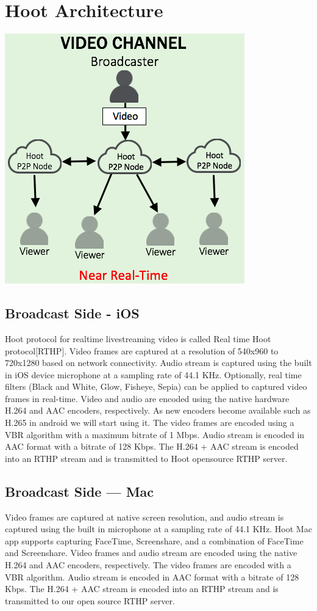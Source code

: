 \section{Hoot Architecture}

\includegraphics[scale=0.5]{hoot-video-architecture-channel}

\subsection{Broadcast Side - iOS}
Hoot protocol for realtime livestreaming video is called Real time Hoot protocol[RTHP].
Video frames are captured at a resolution of 540x960 to 720x1280 based on network connectivity. Audio stream is captured using the built in iOS device microphone at a sampling rate of 44.1 KHz. Optionally, real time filters (Black and White, Glow, Fisheye, Sepia) can be applied to captured video frames in real-time. Video and audio are encoded using the native hardware H.264 and AAC encoders, respectively.  As new encoders become available such as H.265 in android we will start using it. The video frames are encoded using a VBR algorithm with a maximum bitrate of 1 Mbps. Audio stream is encoded in AAC format with a bitrate of 128 Kbps. The H.264 + AAC stream is encoded into an RTHP stream and is transmitted to Hoot opensource RTHP server.

\subsection{Broadcast Side — Mac}
Video frames are captured at native screen resolution, and audio stream is captured using the built in microphone at a sampling rate of 44.1 KHz. Hoot Mac app supports capturing FaceTime, Screenshare, and a combination of FaceTime and Screenshare. Video frames and audio stream are encoded using the native H.264 and AAC encoders, respectively. The video frames are encoded with a VBR algorithm. Audio stream is encoded in AAC format with a bitrate of 128 Kbps. The H.264 + AAC stream is encoded into an RTHP stream and is transmitted to our open source RTHP server.

